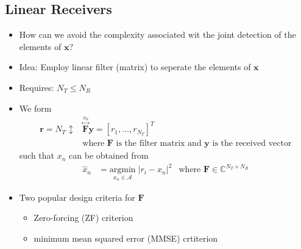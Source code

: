 \documentclass[a4paper, 10pt]{article}
\begin{document}
\subsection{Linear Receivers}
\begin{itemize}
	\item How can we avoid the complexity associated wit the joint detection of the elements of $\mathbf{x}$?
	\item Idea: Employ linear filter (matrix) to seperate  the elements of $\mathbf{x}$
	\item Requires: $N_T \leq N_R$
	\item We form
	\begin{align*}
		\mathbf{r}=N_T\updownarrow &\overset{\overset{N_R}{\longleftrightarrow}}{\mathbf{F}}\mathbf{y}=[r_1,\dots,r_{N_T}]^T\\
	&\text{where $\mathbf{F}$ is the filter matrix and $\mathbf{y}$ is the received vector}
	\end{align*}
	such that $x_n$ can be obtained from
	\begin{align*}
		\hat{x}_n&=\underset{x_n \in \mathscr{A}}{\mathrm{argmin}} \; |r_i-x_n|^2
		&\text{where } \mathbf{F} \in \mathds{C}^{N_T\times N_R}
	\end{align*}
	\item Two popular design criteria for $\mathbf{F}$
	\begin{itemize}
		\item Zero-forcing (ZF) criterion
		\item minimum mean squared error (MMSE) crtiterion
	\end{itemize}
\end{itemize}
\end{document}
